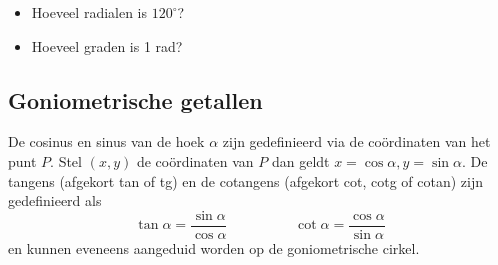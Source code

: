 \documentclass[11pt]{article}
\begin{document}
\begin{itemize}
\item Hoeveel radialen is $120^\circ$?
\item Hoeveel graden is 1 rad?









\end{itemize}

\subsection{Goniometrische getallen}
De cosinus en sinus van de hoek $\alpha$ zijn gedefinieerd via de
co\"ordinaten van het punt $P$. Stel $(x,y)$ de co\"ordinaten van
$P$ dan geldt $x=\cos \alpha, y=\sin \alpha$. De tangens (afgekort
tan of tg) en de cotangens (afgekort cot, cotg of cotan) zijn
gedefinieerd als
\[\tan \alpha=\frac{\sin \alpha}{\cos \alpha} \hspace{2cm} \cot \alpha=\frac{\cos \alpha}{\sin \alpha}\]
en kunnen eveneens aangeduid worden op de goniometrische cirkel.
\end{document}
